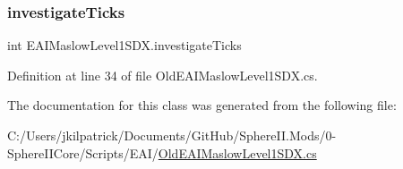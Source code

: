 \subsubsection{\texorpdfstring{investigateTicks}{investigateTicks}}
{\footnotesize\ttfamily int E\+A\+I\+Maslow\+Level1\+S\+D\+X.\+investigate\+Ticks}



Definition at line 34 of file Old\+E\+A\+I\+Maslow\+Level1\+S\+D\+X.\+cs.



The documentation for this class was generated from the following file\+:\begin{DoxyCompactItemize}
\item 
C\+:/\+Users/jkilpatrick/\+Documents/\+Git\+Hub/\+Sphere\+I\+I.\+Mods/0-\/\+Sphere\+I\+I\+Core/\+Scripts/\+E\+A\+I/\mbox{\hyperlink{_old_e_a_i_maslow_level1_s_d_x_8cs}{Old\+E\+A\+I\+Maslow\+Level1\+S\+D\+X.\+cs}}\end{DoxyCompactItemize}
